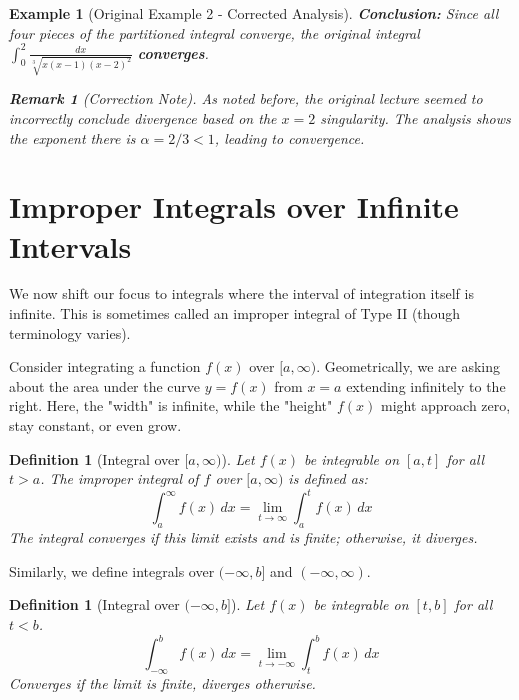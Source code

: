 \documentclass[11pt]{article}
\theoremstyle{mytheoremstyle}
\theoremstyle{mydefinitionstyle}
\newtheorem{definition}[theorem]{Definition}
\newtheorem{example}[theorem]{Example}
\newtheorem{remark}[theorem]{Remark}
\begin{document}
\begin{example}[Original Example 2 - Corrected Analysis]
\textbf{Conclusion:} Since all four pieces of the partitioned integral converge, the original integral $\int_0^2 \frac{dx}{\sqrt[3]{x(x-1)(x-2)^2}}$ \textbf{converges}.

\begin{remark}[Correction Note]
As noted before, the original lecture seemed to incorrectly conclude divergence based on the $x=2$ singularity. The analysis shows the exponent there is $\alpha=2/3 < 1$, leading to convergence.
\end{remark}
\end{example} %

\section{Improper Integrals over Infinite Intervals}

We now shift our focus to integrals where the interval of integration itself is infinite. This is sometimes called an improper integral of Type II (though terminology varies).

Consider integrating a function $f(x)$ over $[a, \infty)$. Geometrically, we are asking about the area under the curve $y=f(x)$ from $x=a$ extending infinitely to the right. Here, the "width" is infinite, while the "height" $f(x)$ might approach zero, stay constant, or even grow.

\begin{definition}[Integral over $[a, \infty)$]
Let $f(x)$ be integrable on $[a, t]$ for all $t > a$. The improper integral of $f$ over $[a, \infty)$ is defined as:
\[ \int_a^\infty f(x) \, dx = \lim_{t \to \infty} \int_a^t f(x) \, dx \]
The integral \emph{converges} if this limit exists and is finite; otherwise, it \emph{diverges}.
\end{definition}

Similarly, we define integrals over $(-\infty, b]$ and $(-\infty, \infty)$.

\begin{definition}[\texorpdfstring{Integral over $(-\infty, b]$}{Integral over (-inf, b]}]
Let $f(x)$ be integrable on $[t, b]$ for all $t < b$.
\[ \int_{-\infty}^b f(x) \, dx = \lim_{t \to -\infty} \int_t^b f(x) \, dx \]
Converges if the limit is finite, diverges otherwise.
\end{definition}
\end{document}
